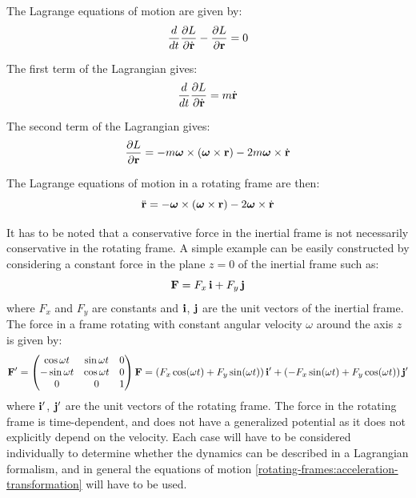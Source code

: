 \documentclass[12pt]{article}
\begin{document}
The Lagrange equations of motion are given by:
\begin{equation}
  \frac{d}{dt}\frac{\partial L}{\partial\dot{\vb{r}}} - \frac{\partial L}{\partial\vb{r}} = 0
\end{equation}

The first term of the Lagrangian gives:
\begin{equation}
  \frac{d}{dt}\frac{\partial L}{\partial\dot{\vb{r}}} = m\dot{\vb{r}}
\end{equation}

The second term of the Lagrangian gives:
\begin{equation}
  \frac{\partial L}{\partial\vb{r}} = -m\boldsymbol{\omega}\times(\boldsymbol{\omega}\times\vb{r})
    - 2m\boldsymbol{\omega}\times\dot{\vb{r}}
\end{equation}

The Lagrange equations of motion in a rotating frame are then:
\begin{equation}
  \ddot{\vb{r}} = -\boldsymbol{\omega}\times(\boldsymbol{\omega}\times\vb{r})
    - 2\boldsymbol{\omega}\times\dot{\vb{r}}
\end{equation}

It has to be noted that a conservative force in the inertial frame is not necessarily
conservative in the rotating frame. A simple example can be easily constructed by considering
a constant force in the plane $z=0$ of the inertial frame such as:
\begin{equation}
  \vb{F} = F_x\,\vb{i} + F_y\,\vb{j}
\end{equation}
where $F_x$ and $F_y$ are constants and $\vb{i}$, $\vb{j}$ are the unit vectors of the
inertial frame. The force in a frame rotating with constant angular velocity $\omega$ around
the axis $z$ is given by:
\begin{equation}
  \vb{F}' =
  \begin{pmatrix}
    \cos\omega t  & \sin\omega t & 0 \\
    -\sin\omega t & \cos\omega t & 0 \\
    0             & 0            & 1
  \end{pmatrix}
  \vb{F}
  = (F_x\cos(\omega t) + F_y\sin(\omega t))\,\vb{i}'
  + (-F_x\sin(\omega t) + F_y\cos(\omega t))\,\vb{j}'
\end{equation}
where $\vb{i}'$, $\vb{j}'$ are the unit vectors of the rotating frame. The force in the
rotating frame is time-dependent, and does not have a generalized potential as it does not
explicitly depend on the velocity. Each case will have to be considered individually to
determine whether the dynamics can be described in a Lagrangian formalism, and in general the
equations of motion \eqref{rotating-frames:acceleration-transformation} will have to be used.

\end{document}
